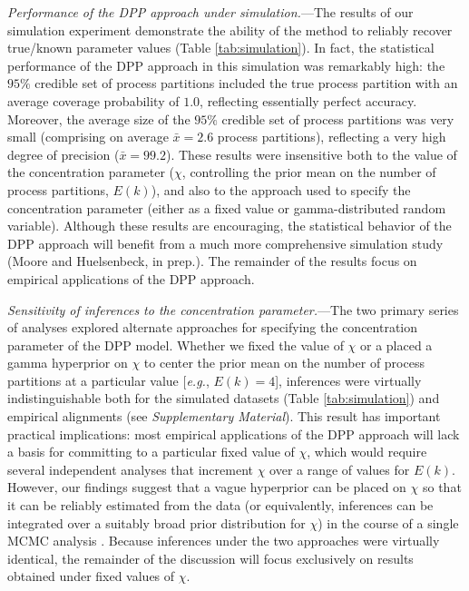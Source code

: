 \documentclass[11pt]{article}
\begin{document}
\bigskip
\noindent
{\it Performance of the DPP approach under simulation.}---The results of our simulation experiment demonstrate the ability of the method to reliably recover true/known parameter values (Table \ref{tab:simulation}).
In fact, the statistical performance of the DPP approach in this simulation was remarkably high: the $95\%$ credible set of process partitions included the true process partition with an average coverage probability of $1.0$, reflecting essentially perfect accuracy.
Moreover, the average size of the $95\%$ credible set of process partitions was very small (comprising on average $\bar{x} = 2.6$ process partitions), reflecting a very high degree of precision ($\bar{x} = 99.2$).
These results were insensitive both to the value of the concentration parameter ($\chi$, controlling the prior mean on the number of process partitions, $E(k)$), and also to the approach used to specify the  concentration parameter (either as a fixed value or gamma-distributed random variable).
Although these results are encouraging, the statistical behavior of the DPP approach will benefit from a much more comprehensive simulation study (Moore and Huelsenbeck, in prep.).
The remainder of the results focus on empirical applications of the DPP approach.


\bigskip
\noindent
{\it Sensitivity of inferences to the concentration parameter.}---The two primary series of analyses explored alternate approaches for specifying the concentration parameter of the DPP model.  
Whether we fixed the value of $\chi$ or a placed a gamma hyperprior on $\chi$ to center the prior mean on the number of process partitions at a particular value [{\it e.g.}, $E(k)=4$], inferences were virtually indistinguishable both for the simulated datasets (Table \ref{tab:simulation}) and empirical alignments (see {\it Supplementary Material}). 
This result has important practical implications: most empirical applications of the DPP approach will lack a basis for committing to a particular fixed value of $\chi$, which would require several independent analyses that increment $\chi$ over a range of values for $E(k)$.  
However, our findings suggest that a vague hyperprior can be placed on $\chi$ so that it can be reliably estimated from the data (or equivalently, inferences can be integrated over a suitably broad prior distribution for $\chi$) in the course of a single MCMC analysis \citep[{\it c.f.},][]{escobar95, west94, gelfand05, dorazio09}.
Because inferences under the two approaches were virtually identical, the remainder of the discussion will focus exclusively on results obtained under fixed values of $\chi$.
\end{document}
